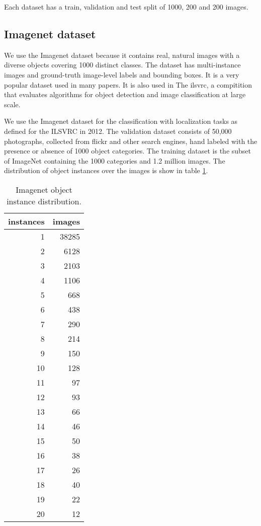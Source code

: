 Each dataset has a train, validation and test split of 1000, 200 and 200 images.

\subsection{Imagenet dataset}
We use the Imagenet dataset because it contains real, natural images with a diverse objects covering 1000 distinct classes. The dataset has multi-instance images and ground-truth image-level labels and bounding boxes. It is a very popular dataset used in many papers. It is also used in The \acrfull{ilsvrc}, a compitition that evaluates algorithms for object detection and image classification at large scale.

We use the Imagenet dataset for the classification with localization tasks as defined for the ILSVRC in 2012. The validation dataset consists of 50,000 photographs, collected from flickr and other search engines, hand labeled with the presence or absence of 1000 object categories. The training dataset is the subset of ImageNet containing the 1000 categories and 1.2 million images. The distribution of object instances over the images is show in table \ref{tab:imagenet_instance_distribution}.
\begin{table}[ht]
\centering
\begin{tabular}{rr}
\toprule
instances &  images \\
\midrule
         1 &   38285 \\
         2 &    6128 \\
         3 &    2103 \\
         4 &    1106 \\
         5 &     668 \\
         6 &     438 \\
         7 &     290 \\
         8 &     214 \\
         9 &     150 \\
        10 &     128 \\
        11 &      97 \\
        12 &      93 \\
        13 &      66 \\
        14 &      46 \\
        15 &      50 \\
        16 &      38 \\
        17 &      26 \\
        18 &      40 \\
        19 &      22 \\
        20 &      12 \\
\bottomrule
\end{tabular}
\caption[Imagenet object instance distribution]{Imagenet object instance distribution.}
\label{tab:imagenet_instance_distribution}
\end{table}

